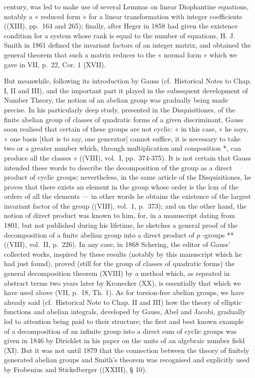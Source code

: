 century, was led to make use of several Lemmas on linear Diophantine equations, notably a « reduced form » for a linear transformation with integer coefficients ((XIII), pp.~164 and 265); finally, after Heger in 1858 had given the existence condition for a system whose rank is equal to the number of equations, H. J. Smith in 1861 defined the invariant factors of an integer matrix, and obtained the general theorem that such a matrix reduces to the « normal form » which we gave in VII, p.~22, Cor. 1 (XVII).

But meanwhile, following its introduction by Gauss (cf.~Historical Notes to Chap. I, II and III), and the important part it played in the subsequent development of Number Theory, the notion of an abelian group was gradually being made precise. In his particularly deep study, presented in the Disquisitiones, of the finite abelian group of classes of quadratic forms of a given discriminant, Gauss soon realised that certain of these groups are not cyclic: « in this case, » he says, « one basis {[}that is to say, one generator{]} cannot suffice, it is necessary to take two or a greater number which, through multiplication and composition *, can produce all the classes » ((VIII), vol.~I, pp.~374-375). It is not certain that Gauss intended these words to describe the decomposition of the group as a direct product of cyclic groups; nevertheless, in the same article of the Disquisitiones, he proves that there exists an element in the group whose order is the lcm of the orders of all the elements --- in other words he obtains the existence of the largest invariant factor of the group ((VIII), vol.~1, p.~373); and on the other hand, the notion of direct product was known to him, for, in a manuscript dating from 1801, but not published during his lifetime, he sketches a general proof of the decomposition of a finite abelian group into a direct product of \(p\) -groups ** ((VIII), vol.~II, p.~226). In any case, in 1868 Schering, the editor of Gauss' collected works, inspired by these results (notably by this manuscript which he had just found), proved (still for the group of classes of quadratic forms) the general decomposition theorem (XVIII) by a method which, as repeated in abstract terms two years later by Kronecker (XX), is essentially that which we have used above (VII, p.~18, Th. 1). As for torsion-free abelian groups, we have already said (cf.~Historical Note to Chap. II and III) how the theory of elliptic functions and abelian integrals, developed by Gauss, Abel and Jacobi, gradually led to attention being paid to their structure; the first and best known example of a decomposition of an infinite group into a direct sum of cyclic groups was given in 1846 by Dirichlet in his paper on the units of an algebraic number field (XI). But it was not until 1879 that the connection between the theory of finitely generated abelian groups and Smith's theorem was recognised and explicitly used by Frobenius and Stickelberger ((XXIII), § 10).

